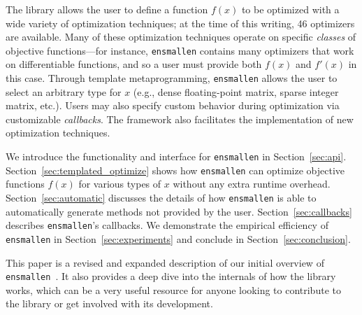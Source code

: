 The library allows the user to define a function $f(x)$ to be optimized with
a wide variety of optimization techniques; at the time of this writing, 46
optimizers are available.  Many of these optimization techniques operate on
specific {\it classes} of objective functions---for instance, {\tt ensmallen}
contains many optimizers that work on differentiable functions, and so a user
must provide both $f(x)$ and $f'(x)$ in this case.
Through template metaprogramming, {\tt ensmallen} allows the user to select
an arbitrary type for $x$ (e.g., dense floating-point matrix, sparse integer matrix, etc.).
Users may also specify custom behavior during optimization via customizable {\it callbacks}.
The framework also facilitates the implementation of new optimization techniques.


We introduce the functionality and interface for {\tt ensmallen} in Section~\ref{sec:api}.
Section~\ref{sec:templated_optimize} shows how {\tt ensmallen} can optimize objective functions
$f(x)$ for various types of $x$ without any extra runtime overhead.
Section~\ref{sec:automatic} discusses the details of how {\tt ensmallen} is able
to automatically generate methods not provided by the user.
Section~\ref{sec:callbacks} describes {\tt ensmallen}'s callbacks.
We demonstrate the empirical efficiency of {\tt ensmallen} in
Section~\ref{sec:experiments} and conclude in Section~\ref{sec:conclusion}.


This paper is a revised and expanded description of our initial overview
of {\tt ensmallen}~\cite{ensmallen2018}. 
It also provides a deep dive into the internals
of how the library works, which can be a very useful resource for anyone looking
to contribute to the library or get involved with its development.

